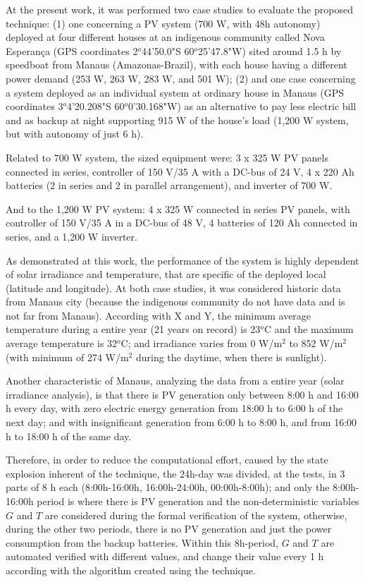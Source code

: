 \documentclass[journal]{IEEEtran}
\begin{document}
At the present work, it was performed two case studies to evaluate the proposed technique: (1) one concerning a PV system (700 W, with 48h autonomy) deployed at four different houses at an indigenous community called Nova Esperan\c{c}a (GPS coordinates 2$^{o}$44'50.0"S 60$^{o}$25'47.8"W) sited around 1.5 h by speedboat from Manaus (Amazonas-Brazil), with each house having a different power demand (253 W, 263 W, 283 W, and 501 W); (2) and one case concerning a system deployed as an individual system at ordinary house in Manaus (GPS coordinates 3$^{o}$4'20.208"S 60$^{o}$0'30.168"W) as an alternative to pay less electric bill and as backup at night supporting 915 W of the house's load (1,200 W system, but with autonomy of just 6 h). 

Related to 700 W system, the sized equipment were: 3 x 325 W PV panels connected in series, controller of 150 V/35 A with a DC-bus of 24 V, 4 x 220 Ah batteries (2 in series and 2 in parallel arrangement), and inverter of 700 W. 

And to the 1,200 W PV system: 4 x 325 W connected in series PV panels, with controller of 150 V/35 A  in a DC-bus of 48 V, 4 batteries of 120 Ah connected in series, and a 1,200 W inverter.

As demonstrated at this work, the performance of the system is highly dependent of solar irradiance and temperature, that are specific of the deployed local (latitude and longitude). At both case studies, it was considered historic data from Manaus city (because the indigenous community do not have data and is not far from Manaus). According with X and Y, the minimum average temperature during a entire year (21 years on record) is 23$^{o}$C and the maximum average temperature is 32$^{o}$C; and irradiance varies from 0 W/m$^{2}$ to 852 W/m$^{2}$ (with minimum of 274 W/m$^{2}$ during the daytime, when there is sunlight). 

Another characteristic of Manaus, analyzing the data from a entire year (solar irradiance analysis), is that there is PV generation only between 8:00 h and 16:00 h every day, with zero electric energy generation from 18:00 h to 6:00 h of the next day; and with insignificant generation from 6:00 h to 8:00 h, and from 16:00 h to 18:00 h of the same day. 

Therefore, in order to reduce the computational effort, caused by the state explosion inherent of the technique, the 24h-day was divided, at the tests, in 3 parts of 8 h each (8:00h-16:00h, 16:00h-24:00h, 00:00h-8:00h); and only the 8:00h-16:00h period is where there is PV generation and the non-deterministic variables $G$ and $T$ are considered during the formal verification of the system, otherwise, during the other two periods, there is no PV generation and just the power consumption from the backup batteries. Within this 8h-period, $G$ and $T$ are automated verified with different values, and change their value every 1 h according with the algorithm created using the technique.
\end{document}
